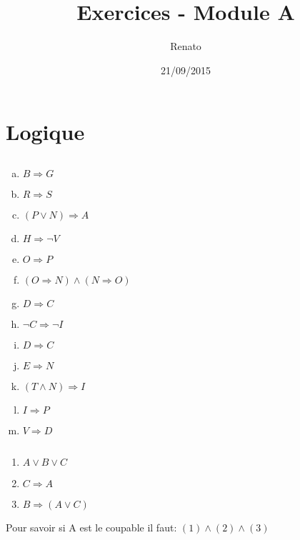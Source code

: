\documentclass{report}
\title{\Large{\bsc{MATH-F-112 - Math\'{e}matiques}}\\
  Exercices - Module A
  }
\author{Renato \bsc{Costa Ribeiro}}
\date{21/09/2015}
\begin{document}
\maketitle
\tableofcontents

\chapter{Logique}
  \section{} %
    \begin{multicols}{4}
      \begin{enumerate}[a.]
	\item $B \Rightarrow G$
	\item $R \Rightarrow S$
	\item $(P \vee N) \Rightarrow A$
	\item $H \Rightarrow \neg V$
	\item $O \Rightarrow P$
	\item $(O \Rightarrow N) \wedge (N \Rightarrow O)$
	\item $D \Rightarrow C$
	\item $\neg C \Rightarrow \neg I$
	\item $D \Rightarrow C$
	\item $E \Rightarrow N$
	\item $(T \wedge N) \Rightarrow I$
	\item $I \Rightarrow P$
	\item $V \Rightarrow D$
      \end{enumerate}
    \end{multicols}

    
  \section{} %

  \begin{enumerate}[(1).]
  \item $A \vee B \vee C$
  \item $C \Rightarrow A$
  \item $B \Rightarrow (A \vee C)$
  \end{enumerate}
  Pour savoir si A est le coupable il faut: $(1)\wedge(2)\wedge(3)$
\end{document}
